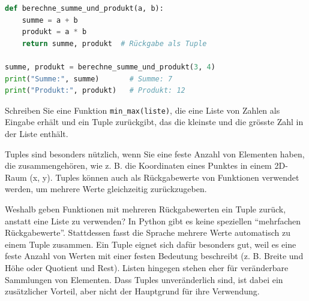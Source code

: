 \begin{myexample}
	\leavevmode
	\begin{lstlisting}[language=Python]
def berechne_summe_und_produkt(a, b):
	summe = a + b
	produkt = a * b
	return summe, produkt  # Rückgabe als Tuple

summe, produkt = berechne_summe_und_produkt(3, 4)
print("Summe:", summe)       # Summe: 7
print("Produkt:", produkt)   # Produkt: 12
\end{lstlisting}
\end{myexample}

\begin{myexercise}

	Schreiben Sie eine Funktion \lstinline|min_max(liste)|, die eine Liste von Zahlen als Eingabe erhält und ein Tuple zurückgibt, das die kleinste und die grösste Zahl in der Liste enthält.

	\begin{myanswer}
		
	\end{myanswer}

\end{myexercise}

\begin{myremark}
	Tuples sind besonders nützlich, wenn Sie eine feste Anzahl von Elementen haben, die zusammengehören, wie z. B. die Koordinaten eines Punktes in einem 2D-Raum (x, y). Tuples können auch als Rückgabewerte von Funktionen verwendet werden, um mehrere Werte gleichzeitig zurückzugeben.

	Weshalb geben Funktionen mit mehreren Rückgabewerten ein Tuple zurück, anstatt eine Liste zu verwenden? In Python gibt es keine speziellen \enquote{mehrfachen Rückgabewerte}. Stattdessen fasst die Sprache mehrere Werte automatisch zu einem Tuple zusammen. Ein Tuple eignet sich dafür besonders gut, weil es eine feste Anzahl von Werten mit einer festen Bedeutung beschreibt (z. B. Breite und Höhe oder Quotient und Rest). Listen hingegen stehen eher für veränderbare Sammlungen von Elementen. Dass Tuples unveränderlich sind, ist dabei ein zusätzlicher Vorteil, aber nicht der Hauptgrund für ihre Verwendung.
\end{myremark}

